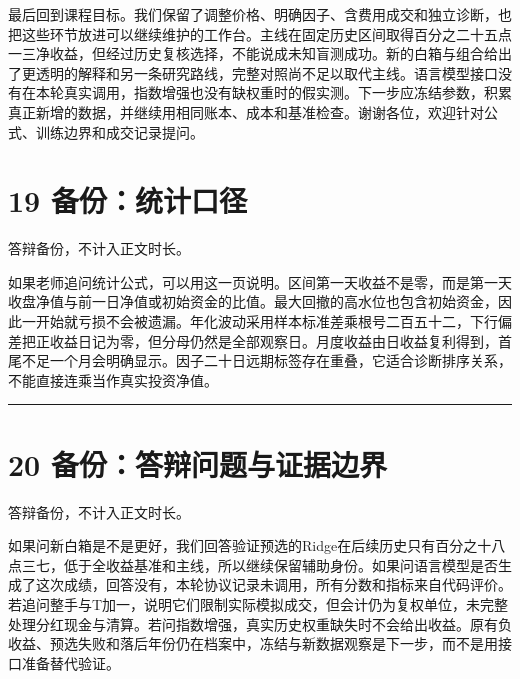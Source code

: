 \documentclass[UTF8,a4paper,12pt]{ctexart}
\begin{document}
最后回到课程目标。我们保留了调整价格、明确因子、含费用成交和独立诊断，也把这些环节放进可以继续维护的工作台。主线在固定历史区间取得百分之二十五点一三净收益，但经过历史复核选择，不能说成未知盲测成功。新的白箱与组合给出了更透明的解释和另一条研究路线，完整对照尚不足以取代主线。语言模型接口没有在本轮真实调用，指数增强也没有缺权重时的假实测。下一步应冻结参数，积累真正新增的数据，并继续用相同账本、成本和基准检查。谢谢各位，欢迎针对公式、训练边界和成交记录提问。


\newpage

\section*{\color{ink}19  备份：统计口径}

{\small\color{accent}答辩备份，不计入正文时长。}\par

如果老师追问统计公式，可以用这一页说明。区间第一天收益不是零，而是第一天收盘净值与前一日净值或初始资金的比值。最大回撤的高水位也包含初始资金，因此一开始就亏损不会被遗漏。年化波动采用样本标准差乘根号二百五十二，下行偏差把正收益日记为零，但分母仍然是全部观察日。月度收益由日收益复利得到，首尾不足一个月会明确显示。因子二十日远期标签存在重叠，它适合诊断排序关系，不能直接连乘当作真实投资净值。


\vspace{4mm}\noindent\textcolor{accent!40}{\rule{\textwidth}{0.4pt}}\par

\section*{\color{ink}20  备份：答辩问题与证据边界}

{\small\color{accent}答辩备份，不计入正文时长。}\par

如果问新白箱是不是更好，我们回答验证预选的Ridge在后续历史只有百分之十八点三七，低于全收益基准和主线，所以继续保留辅助身份。如果问语言模型是否生成了这次成绩，回答没有，本轮协议记录未调用，所有分数和指标来自代码评价。若追问整手与T加一，说明它们限制实际模拟成交，但会计仍为复权单位，未完整处理分红现金与清算。若问指数增强，真实历史权重缺失时不会给出收益。原有负收益、预选失败和落后年份仍在档案中，冻结与新数据观察是下一步，而不是用接口准备替代验证。
\end{document}
